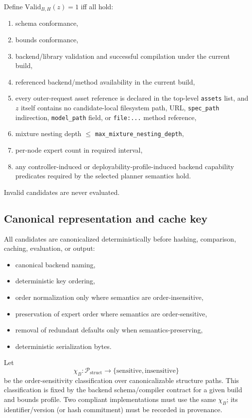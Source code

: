 \documentclass[11pt]{article}
\begin{document}
Define $\mathrm{Valid}_{B,H}(z)=1$ iff all hold:
\begin{enumerate}
    \item schema conformance,
    \item bounds conformance,
    \item backend/library validation and successful compilation under the
    current build,
    \item referenced backend/method availability in the current build,
    \item every outer-request asset reference is declared in the top-level
    \texttt{assets} list, and $z$ itself contains no candidate-local
    filesystem path, URL, \texttt{spec\_path} indirection, \texttt{model\_path}
    field, or \texttt{file:...} method reference,
    \item mixture nesting depth $\le$ \texttt{max\_mixture\_nesting\_depth},
    \item per-node expert count in required interval,
    \item any controller-induced or deployability-profile-induced backend
    capability predicates required by the selected planner semantics hold.
\end{enumerate}

Invalid candidates are never evaluated.

\subsection{Canonical representation and cache key}\label{sec:canon-cache}

All candidates are canonicalized deterministically before hashing,
comparison, caching, evaluation, or output:
\begin{itemize}
    \item canonical backend naming,
    \item deterministic key ordering,
    \item order normalization only where semantics are order-insensitive,
    \item preservation of expert order where semantics are order-sensitive,
    \item removal of redundant defaults only when semantics-preserving,
    \item deterministic serialization bytes.
\end{itemize}

Let
\[
\chi_B:\mathcal{P}_{\mathrm{struct}}\to\{\mathrm{sensitive},\mathrm{insensitive}\}
\]
be the order-sensitivity classification over canonicalizable structure paths.
This classification is fixed by the backend schema/compiler contract for a
given build and bounds profile. Two compliant implementations must use the same
$\chi_B$; its identifier/version (or hash commitment) must be recorded in
provenance.
\end{document}
